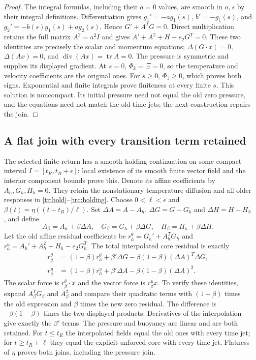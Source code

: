 \begin{proof}
The integral formulas, including their $a=0$ values, are smooth
in $a,s$ by their integral definitions.  Differentiation gives
$g_1'=-ag_1(s)$, $b'=-g_1(s)$, and
$g_2'=-b(s)g_1(s)+ag_2(s)$.  Hence
$G'+A^TG=0$.  Direct multiplication retains the full matrix
$A^2=a^2I$ and gives
$A'+A^2+H-e_2G^T=0$.
These two identities are precisely the scalar and momentum
equations; $\Delta(G\cdot x)=0$, $\Delta(Ax)=0$, and
$\operatorname{div}(Ax)=\operatorname{tr}A=0$.
The pressure is symmetric and supplies its displayed gradient.
At $s=0$, $\Phi_k=\Xi=0$, so the temperature and velocity
coefficients are the original ones.  For $s\geq0$,
$\Phi_1\geq0$, which proves both signs.
Exponential and finite integrals prove finiteness at every finite
$s$.  This solution is noncompact.  Its initial pressure need
not equal the old zero pressure, and the equations need not
match the old time jets; the next construction repairs the join.
\end{proof}

\subsection{A flat join with every transition term retained}

The selected finite return has a smooth holding continuation on
some compact interval $I=[t_R,t_R+\epsilon]$: local existence of
its smooth finite vector field and the interior component bounds
prove this.  Denote its affine coefficients by $A_h,G_h,H_h=0$.
They retain the nonstationary temperature diffusion and all older
responses in \eqref{tr:hold}--\eqref{trc:holding}.
Choose $0<\ell<\epsilon$ and $\beta(t)=\eta((t-t_R)/\ell)$.
Set $\Delta A=A-A_h$, $\Delta G=G-G_h$ and $\Delta H=H-H_h$,
and define
\begin{equation}\label{irc:flat-interpolation}
 A_\beta=A_h+\beta\Delta A,\quad
 G_\beta=G_h+\beta\Delta G,\quad
 H_\beta=H_h+\beta\Delta H.
\end{equation}
Let the old affine residual coefficients be
$r_h^\theta=G_h'+A_h^TG_h$ and
$r_h^u=A_h'+A_h^2+H_h-e_2G_h^T$.
The total interpolated core residual is exactly
\begin{align}
 r_\beta^\theta&=(1-\beta)r_h^\theta
             +\beta'\Delta G
             -\beta(1-\beta)(\Delta A)^T\Delta G,
 \label{irc:transition-scalar}\\
 r_\beta^u&=(1-\beta)r_h^u
             +\beta'\Delta A-\beta(1-\beta)(\Delta A)^2.
 \label{irc:transition-vector}
\end{align}
The scalar force is $r_\beta^\theta\cdot x$ and the vector
force is $r_\beta^ux$.  To verify these identities, expand
$A_\beta^TG_\beta$ and $A_\beta^2$ and compare their
quadratic terms with $(1-\beta)$ times the old expression and
$\beta$ times the new zero residual.  The difference is
$-\beta(1-\beta)$ times the two displayed products.  Derivatives
of the interpolation give exactly the $\beta'$ terms.
The pressure and buoyancy are linear and are both retained.
For $t\leq t_R$ the interpolated fields equal the old ones with
every time jet; for $t\geq t_R+\ell$ they equal the explicit
unforced core with every time jet.  Flatness of $\eta$ proves both
joins, including the pressure join.

